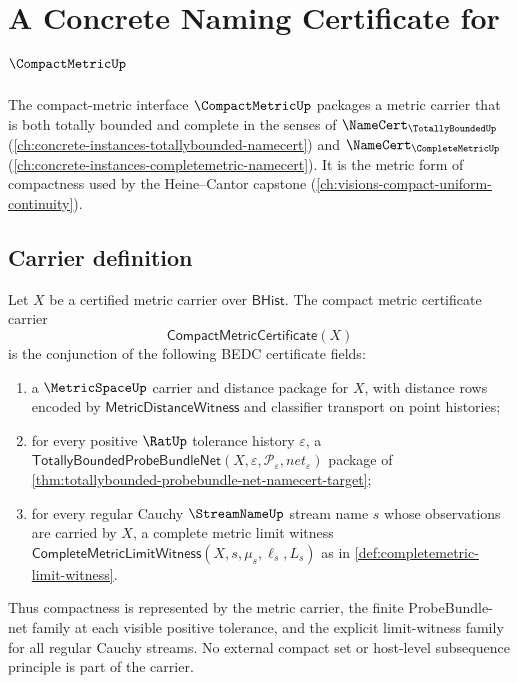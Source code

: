 \chapter{A Concrete Naming Certificate for $\CompactMetricUp$}
\label{ch:concrete-instances-compactmetric-namecert}

The compact-metric interface $\CompactMetricUp$ packages a metric carrier that is both totally bounded and complete in the senses of $\NameCert_{\TotallyBoundedUp}$ (\autoref{ch:concrete-instances-totallybounded-namecert}) and $\NameCert_{\CompleteMetricUp}$ (\autoref{ch:concrete-instances-completemetric-namecert}). It is the metric form of compactness used by the Heine--Cantor capstone (\autoref{ch:visions-compact-uniform-continuity}).

\section{Carrier definition}
\label{sec:compactmetric-carrier}

\begin{definition}
\label{def:compactmetric-certificate-carrier}
Let $X$ be a certified metric carrier over $\mathsf{BHist}$. The compact
metric certificate carrier
$$
\mathsf{CompactMetricCertificate}(X)
$$
is the conjunction of the following BEDC certificate fields:
\begin{enumerate}
  \item a $\MetricSpaceUp$ carrier and distance package for $X$, with
  distance rows encoded by $\mathsf{MetricDistanceWitness}$ and classifier
  transport on point histories;
  \item for every positive $\RatUp$ tolerance history $\varepsilon$, a
  $\mathsf{TotallyBoundedProbeBundleNet}(X,\varepsilon,\mathcal{P}_{\varepsilon},net_{\varepsilon})$
  package of
  \autoref{thm:totallybounded-probebundle-net-namecert-target};
  \item for every regular Cauchy $\StreamNameUp$ stream name $s$ whose
  observations are carried by $X$, a complete metric limit witness
  $\mathsf{CompleteMetricLimitWitness}(X,s,\mu_s,\ell_s,L_s)$ as in
  \autoref{def:completemetric-limit-witness}.
\end{enumerate}
Thus compactness is represented by the metric carrier, the finite
ProbeBundle-net family at each visible positive tolerance, and the explicit
limit-witness family for all regular Cauchy streams. No external compact set
or host-level subsequence principle is part of the carrier.
\end{definition}


